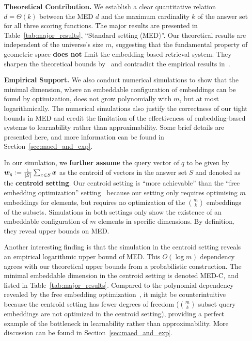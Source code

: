 \textbf{Theoretical Contribution.} We establish a clear quantitative relation $d = \Theta(k)$ between the MED $d$ and the maximum cardinality $k$ of the answer set for all three scoring functions. The major results are presented in Table~\ref{tab:major_results}, ``Standard setting (MED)''. Our theoretical results are independent of the universe's size $m$, suggesting that the fundamental property of geometric space \textbf{does not} limit the embedding-based retrieval system. They sharpen the theoretical bounds by~\citet{weller2025theoretical} and contradict the empirical results in~\citet{weller2025theoretical}.

\textbf{Empirical Support.} We also conduct numerical simulations to show that the minimal dimension, where an embeddable configuration of embeddings can be found by optimization, does not grow polynomially with $m$, but at most logarithmically. The numerical simulations also justify the correctness of our tight bounds in MED and credit the limitation of the effectiveness of embedding-based systems to learnability rather than approximability. Some brief details are presented here, and more information can be found in Section~\ref{sec:maed_and_exp}.



In our simulation, we \textbf{further assume} the query vector of $q$ to be given by $\bm{w}_q:= \frac{1}{|S|}\sum_{x\in S} \bm{x}$ as the centroid of vectors in the answer set $S$ and denoted as the \textbf{centroid setting}. Our centroid setting is ``more achievable'' than the ``free embedding optimization'' setting~\citep{weller2025theoretical} because our setting only requires optimising $m$ embeddings for elements, but requires no optimization of the $\binom{m}{k}$ embeddings of the subsets. Simulations in both settings only show the existence of an embeddable configuration of $m$ elements in specific dimensions. By definition, they reveal upper bounds on MED.

Another interesting finding is that the simulation in the centroid setting reveals an empirical logarithmic upper bound of MED. This $O(\log m)$ dependency agrees with our theoretical upper bounds from a probabilistic construction. The minimal embeddable dimension in the centroid setting is denoted MED-C, and listed in Table~\ref{tab:major_results}. Compared to the polynomial dependency revealed by the free embedding optimization~\citep{weller2025theoretical}, it might be counterintuitive because the centroid setting has fewer degrees of freedom ($\binom{m}{k}$ subset query embeddings are not optimized in the centroid setting), providing a perfect example of the bottleneck in learnability rather than approximability. More discussion can be found in Section~\ref{sec:maed_and_exp}.

